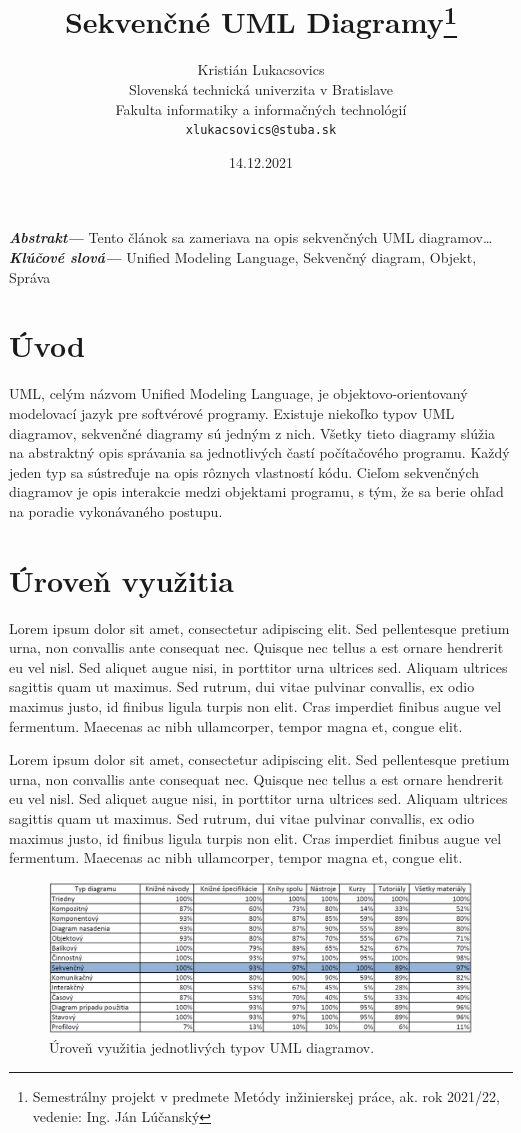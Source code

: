\documentclass[10pt,slovak,a4paper]{article}
\title{Sekvenčné UML Diagramy\thanks{Semestrálny projekt v predmete Metódy inžinierskej práce, ak. rok 2021/22, vedenie: Ing. Ján Lúčanský}}
\author{Kristián Lukacsovics\\[2pt]
    {\small Slovenská technická univerzita v Bratislave}\\
    {\small Fakulta informatiky a informačných technológií}\\
    {\small \texttt{xlukacsovics@stuba.sk}}
    }
\date{\small 14.12.2021} %
\providecommand{\abstr}[1]{\textbf{\textit{Abstrakt---}} #1}
\providecommand{\keywords}[1]{\textbf{\textit{Klúčové slová---}} #1}
\begin{document}
\maketitle

\abstr{Tento článok sa zameriava na opis sekvenčných UML diagramov\ldots\newline}
\indent\keywords{Unified Modeling Language, Sekvenčný diagram, Objekt, Správa}

\section{Úvod}
UML, celým názvom Unified Modeling Language, je objektovo-orientovaný modelovací jazyk pre softvérové programy. \cite{eriksson98}
Existuje niekoľko typov UML diagramov, sekvenčné diagramy sú jedným z nich. Všetky tieto diagramy slúžia na
abstraktný opis správania sa jednotlivých častí počítačového programu. Každý jeden typ sa sústreďuje na opis
rôznych vlastností kódu. Cieľom sekvenčných diagramov je opis interakcie medzi objektami programu, s tým, že sa
berie ohľad na poradie vykonávaného postupu. \cite{petraq14}

\section{Úroveň využitia}
Lorem ipsum dolor sit amet, consectetur adipiscing elit. Sed pellentesque pretium urna, non convallis ante consequat nec. 
Quisque nec tellus a est ornare hendrerit eu vel nisl. Sed aliquet augue nisi, in porttitor urna ultrices sed. 
Aliquam ultrices sagittis quam ut maximus. Sed rutrum, dui vitae pulvinar convallis, ex odio maximus justo, id finibus ligula turpis non elit. 
Cras imperdiet finibus augue vel fermentum. Maecenas ac nibh ullamcorper, tempor magna et, congue elit. \newline

Lorem ipsum dolor sit amet, consectetur adipiscing elit. Sed pellentesque pretium urna, non convallis ante consequat nec. 
Quisque nec tellus a est ornare hendrerit eu vel nisl. Sed aliquet augue nisi, in porttitor urna ultrices sed.
Aliquam ultrices sagittis quam ut maximus. Sed rutrum, dui vitae pulvinar convallis, ex odio maximus justo, id finibus ligula turpis non elit. 
Cras imperdiet finibus augue vel fermentum. Maecenas ac nibh ullamcorper, tempor magna et, congue elit.

\begin{figure}[tbh]
\centering
\includegraphics[scale=0.5]{tab.pdf}
\caption{Úroveň využitia jednotlivých typov UML diagramov. \cite{reggio13}}
\end{figure}
\end{document}
